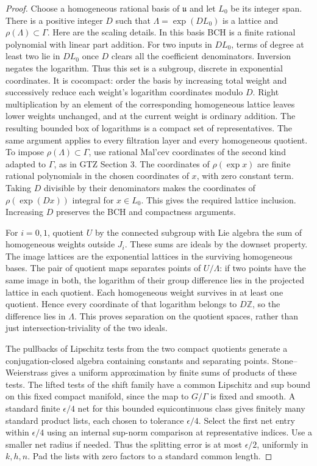 \documentclass[11pt]{article}
\begin{document}
\begin{proof}
Choose a homogeneous rational basis of $\mathfrak u$ and let
$L_0$ be its integer span. There is a positive integer $D$ such
that $\Lambda=\exp(D L_0)$ is a lattice and $\rho(\Lambda)\subset
\Gamma$. Here are the scaling details. In this basis BCH is a
finite rational polynomial with linear part addition. For two
inputs in $D L_0$, terms of degree at least two lie in $D L_0$
once $D$ clears all the coefficient denominators. Inversion
negates the logarithm. Thus this set is a subgroup, discrete
in exponential coordinates. It is cocompact: order the basis
by increasing total weight and successively reduce each weight's
logarithm coordinates modulo $D$. Right multiplication by an
element of the corresponding homogeneous lattice leaves lower
weights unchanged, and at the current weight is ordinary
addition. The resulting bounded box of logarithms is a compact
set of representatives. The same argument applies to every
filtration layer and every homogeneous quotient. To impose
$\rho(\Lambda)\subset\Gamma$, use rational Mal'cev coordinates
of the second kind adapted to $\Gamma$, as in GTZ Section 3.
The coordinates of $\rho(\exp x)$ are finite rational
polynomials in the chosen coordinates of $x$, with zero constant
term. Taking $D$ divisible by their denominators makes the
coordinates of $\rho(\exp(D x))$ integral for $x\in L_0$.
This gives the required lattice inclusion. Increasing $D$ preserves
the BCH and compactness arguments.

For $i=0,1$, quotient $U$ by the connected subgroup with
Lie algebra the sum of homogeneous weights outside $J_i$.
These sums are ideals by the downset property. The image
lattices are the exponential lattices in the surviving
homogeneous bases. The pair of quotient maps separates points
of $U/\Lambda$: if two points have the same image in both,
the logarithm of their group difference lies in the projected
lattice in each quotient. Each homogeneous weight survives
in at least one quotient. Hence every coordinate of that
logarithm belongs to $D\mathbb Z$, so the difference lies in
$\Lambda$. This proves separation on the quotient spaces,
rather than just intersection-triviality of the two ideals.

The pullbacks of Lipschitz tests from the two compact quotients
generate a conjugation-closed algebra containing constants
and separating points. Stone--Weierstrass gives a uniform
approximation by finite sums of products of these tests.
The lifted tests of the shift family have a common Lipschitz
and sup bound on this fixed compact manifold, since the
map to $G/\Gamma$ is fixed and smooth. A standard finite
$\epsilon/4$ net for this bounded equicontinuous class gives
finitely many standard product lists, each chosen to tolerance
$\epsilon/4$. Select the first net entry within $\epsilon/4$
using an internal sup-norm comparison at representative indices.
Use a smaller net radius if needed. Thus the splitting error
is at most $\epsilon/2$, uniformly in $k,h,n$. Pad the lists
with zero factors to a standard common length.


\end{proof}
\end{document}
